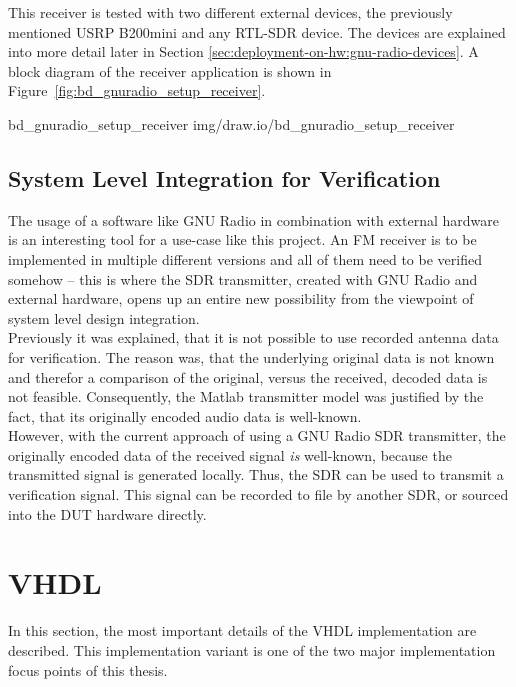 This receiver is tested with two different external devices, the previously mentioned USRP B200mini and any RTL-SDR device.
The devices are explained into more detail later in Section \ref{sec:deployment-on-hw:gnu-radio-devices}.
A block diagram of the receiver application is shown in Figure~\ref{fig:bd_gnuradio_setup_receiver}.

 {bd_gnuradio_setup_receiver} {img/draw.io/bd_gnuradio_setup_receiver}

\subsection{System Level Integration for Verification}

The usage of a software like GNU Radio in combination with external hardware is an interesting tool for a use-case like this project.
An FM receiver is to be implemented in multiple different versions and all of them need to be verified somehow -- this is where the SDR transmitter, created with GNU Radio and external hardware, opens up an entire new possibility from the viewpoint of system level design integration.\\

Previously it was explained, that it is not possible to use recorded antenna data for verification.
The reason was, that the underlying original data is not known and therefor a comparison of the original, versus the received, decoded data is not feasible.
Consequently, the Matlab transmitter model was justified by the fact, that its originally encoded audio data is well-known.\\

However, with the current approach of using a GNU Radio SDR transmitter, the originally encoded data of the received signal \textit{is} well-known, because the transmitted signal is generated locally.
Thus, the SDR can be used to transmit a verification signal.
This signal can be recorded to file by another SDR, or sourced into the DUT hardware directly.

\section{VHDL}

In this section, the most important details of the VHDL implementation are described.
This implementation variant is one of the two major implementation focus points of this thesis.

